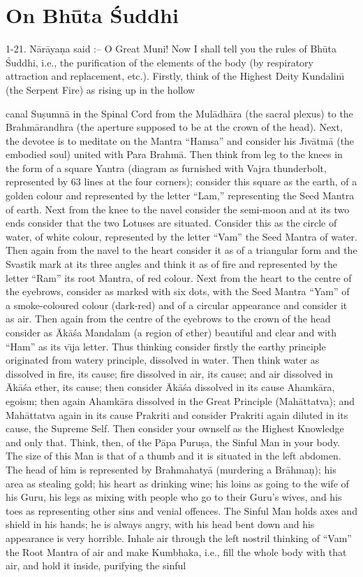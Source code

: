 \chapter{On Bh\=uta \'Suddhi}

1-21. N\=ar\=aya\d{n}a said :-- O Great Muni! Now I shall tell you the rules of Bh\=uta \'Suddhi, i.e., the purification of the elements of the body (by respiratory attraction and replacement, etc.). Firstly, think of the Highest Deity Kundalin\={\i} (the Serpent Fire) as rising up in the hollow

canal Su\d{s}umn\=a in the Spinal Cord from the Mul\=adh\=ara (the sacral plexus) to the Brahm\=arandhra (the aperture supposed to be at the crown of the head). Next, the devotee is to meditate on the Mantra ``Hamsa'' and consider his J\={\i}v\=atm\=a (the embodied soul) united with Para Brahm\=a. Then think from leg to the knees in the form of a square Yantra (diagram as furnished with Vajra thunderbolt, represented by 63 lines at the four corners); consider this square as the earth, of a golden colour and represented by the letter ``Lam,'' representing the Seed Mantra of earth. Next from the knee to the navel consider the semi-moon and at its two ends consider that the two Lotuses are situated. Consider this as the circle of water, of white colour, represented by the letter ``Vam'' the Seed Mantra of water. Then again from the navel to the heart consider it as of a triangular form and the Svastik mark at its three angles and think it as of fire and represented by the letter ``Ram'' its root Mantra, of red colour. Next from the heart to the centre of the eyebrows, consider as marked with six dots, with the Seed Mantra ``Yam'' of a smoke-coloured colour (dark-red) and of a circular appearance and consider it as air. Then again from the centre of the eyebrows to the crown of the head consider as \=Ak\=a\'sa Mandalam (a region of ether) beautiful and clear and with ``Ham'' as its v\={\i}ja letter. Thus thinking consider firstly the earthy principle originated from watery principle, dissolved in water. Then think water as dissolved in fire, its cause; fire dissolved in air, its cause; and air dissolved in \=Ak\=a\'sa ether, its cause; then consider \=Ak\=a\'sa dissolved in its cause Ahamk\=ara, egoism; then again Ahamk\=ara dissolved in the Great Principle (Mah\=attatva); and Mah\=attatva again in its cause Prakriti and consider Prakriti again diluted in its cause, the Supreme Self. Then consider your ownself as the Highest Knowledge and only that. Think, then, of the P\=apa Puru\d{s}a, the Sinful Man in your body. The size of this Man is that of a thumb and it is situated in the left abdomen. The head of him is represented by Brahmahaty\=a (murdering a Br\=ahma\d{n}); his area as stealing gold; his heart as drinking wine; his loins as going to the wife of his Guru, his legs as mixing with people who go to their Guru's wives, and his toes as representing other sins and venial offences. The Sinful Man holds axes and shield in his hands; he is always angry, with his head bent down and his appearance is very horrible. Inhale air through the left nostril thinking of ``Vam'' the Root Mantra of air and make Kumbhaka, i.e., fill the whole body with that air, and hold it inside, purifying the sinful 